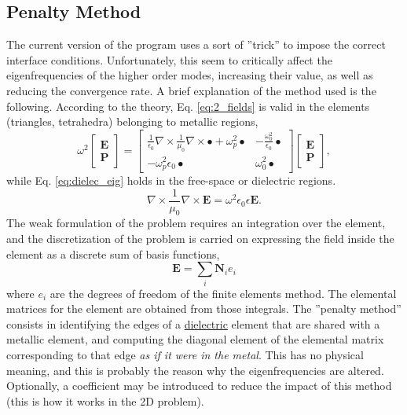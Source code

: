 \documentclass[11pt,a4paper,oneside]{article}
\begin{document}
\subsection{Penalty Method}
The current version of the program uses a sort of ''trick'' to impose the correct interface conditions. Unfortunately, this seem to critically affect the eigenfrequencies of the higher order modes, increasing their value, as well as reducing the convergence rate.
A brief explanation of the method used is the following. According to the theory, Eq. \eqref{eq:2_fields} is valid in the elements (triangles, tetrahedra) belonging to metallic regions,
\begin{equation}
\omega^{2}\left[
\begin{array}{c}
\boldsymbol{E}\\
\boldsymbol{P}
\end{array}
\right]=\left[
\begin{array}{cc}
\frac{1}{\epsilon_{0}}\nabla\times\frac{1}{\mu_{0}}\nabla\times\bullet+\omega_{p}^{2}\bullet & -\frac{\omega_{0}^{2}}{\epsilon_{0}}\bullet\\
-\omega_{p}^{2}\epsilon_{0}\bullet & \omega_{0}^{2}\bullet
\end{array}
\right]\left[
\begin{array}{c}
\boldsymbol{E}\\
\boldsymbol{P}
\end{array}
\right],
\label{eq:2_fields}
\end{equation}
while Eq. \eqref{eq:dielec_eig} holds in the free-space or dielectric regions.
\begin{equation}
\nabla \times \frac{1}{\mu_0} \nabla \times \boldsymbol{E} = \omega^2 \epsilon_0 \epsilon \boldsymbol{E}.
\label{eq:dielec_eig}
\end{equation}
The weak formulation of the problem requires an integration over the element, and the discretization of the problem is carried on expressing the field inside the element as a discrete sum of basis functions,
\begin{equation}
\boldsymbol{E} = \sum_i \boldsymbol{N}_i e_i
\end{equation}
where $e_i$ are the degrees of freedom of the finite elements method. The elemental matrices for the element are obtained from those integrals. The ''penalty method'' consists in identifying the edges of a \underline{dielectric} element that are shared with a metallic element, and computing the diagonal element of the elemental matrix corresponding to that edge {\it as if it were in the metal}. This has no physical meaning, and this is probably the reason why the eigenfrequencies are altered. Optionally, a coefficient may be introduced to reduce the impact of this method (this is how it works in the 2D problem).
\end{document}
